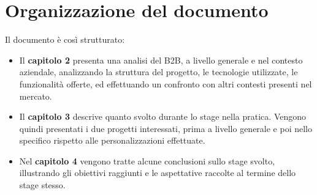 
\section{Organizzazione del documento}
Il documento è così strutturato:
\begin{itemize}
	\item Il \textbf{capitolo 2} presenta una analisi del B2B, a livello generale e nel contesto aziendale, analizzando la struttura del progetto, le tecnologie utilizzate, le funzionalità offerte, ed effettuando un confronto con altri contesti presenti nel mercato.
	\item Il \textbf{capitolo 3} descrive quanto svolto durante lo stage nella pratica. Vengono quindi presentati i due progetti interessati, prima a livello generale e poi nello specifico rispetto alle personalizzazioni effettuate.
	\item Nel \textbf{capitolo 4} vengono tratte alcune conclusioni sullo stage svolto, illustrando gli obiettivi raggiunti e le aspettative raccolte al termine dello stage stesso.
\end{itemize}